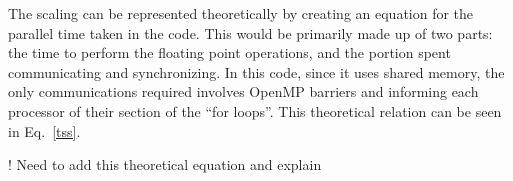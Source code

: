 \documentclass[12pt]{article}
\begin{document}
The scaling can be represented theoretically by creating an equation for the parallel time taken in the code. This would be primarily made up of two parts: the time to perform the floating point operations, and the portion spent communicating and synchronizing. In this code, since it uses shared memory, the only communications required involves OpenMP barriers and informing each processor of their section of the ``for loops''. This theoretical relation can be seen in Eq.~\ref{tss}.



! Need to add this theoretical equation and explain
\FloatBarrier
	 
	
	
\end{document}
